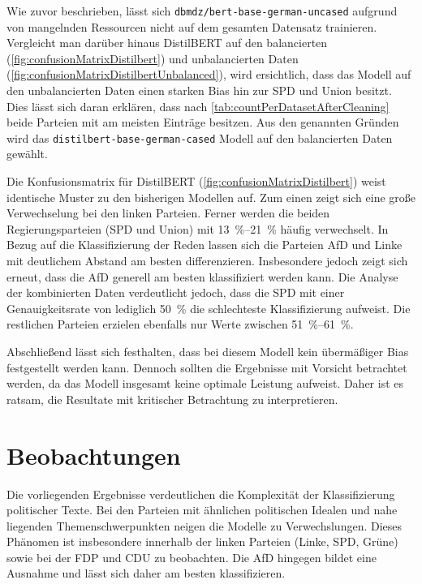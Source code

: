 Wie zuvor beschrieben, lässt sich \texttt{dbmdz/bert-base-german-uncased} aufgrund von mangelnden Ressourcen nicht auf dem gesamten Datensatz trainieren. Vergleicht man darüber hinaus DistilBERT auf den balancierten (\autoref{fig:confusionMatrixDistilbert}) und unbalancierten Daten (\autoref{fig:confusionMatrixDistilbertUnbalanced}), wird ersichtlich, dass das Modell auf den unbalancierten Daten einen starken Bias hin zur \ac{SPD} und Union besitzt. Dies lässt sich daran erklären, dass nach \autoref{tab:countPerDatasetAfterCleaning} beide Parteien mit am meisten Einträge besitzen. Aus den genannten Gründen wird das \texttt{distilbert-base-german-cased} Modell auf den balancierten Daten gewählt.

Die Konfusionsmatrix für DistilBERT (\autoref{fig:confusionMatrixDistilbert}) weist identische Muster zu den bisherigen Modellen auf. Zum einen zeigt sich eine große Verwechselung bei den linken Parteien. Ferner werden die beiden Regierungsparteien (\ac{SPD} und Union) mit \SIrange{13}{21}{\percent} häufig verwechselt. In Bezug auf die Klassifizierung der Reden lassen sich die Parteien \ac{AfD} und Linke mit deutlichem Abstand am besten differenzieren. Insbesondere jedoch zeigt sich erneut, dass die \ac{AfD} generell am besten klassifiziert werden kann. Die Analyse der kombinierten Daten verdeutlicht jedoch, dass die \ac{SPD} mit einer Genauigkeitsrate von lediglich \SI{50}{\percent} die schlechteste Klassifizierung aufweist. Die restlichen Parteien erzielen ebenfalls nur Werte zwischen \SIrange{51}{61}{\percent}.

Abschließend lässt sich festhalten, dass bei diesem Modell kein übermäßiger Bias festgestellt werden kann. Dennoch sollten die Ergebnisse mit Vorsicht betrachtet werden, da das Modell insgesamt keine optimale Leistung aufweist. Daher ist es ratsam, die Resultate mit kritischer Betrachtung zu interpretieren.

\section{Beobachtungen}

Die vorliegenden Ergebnisse verdeutlichen die Komplexität der Klassifizierung politischer Texte. Bei den Parteien mit ähnlichen politischen Idealen und nahe liegenden Themenschwerpunkten neigen die Modelle zu Verwechslungen. Dieses Phänomen ist insbesondere innerhalb der linken Parteien (Linke, \ac{SPD}, Grüne) sowie bei der \ac{FDP} und \ac{CDU} zu beobachten. Die \ac{AfD} hingegen bildet eine Ausnahme und lässt sich daher am besten klassifizieren.

